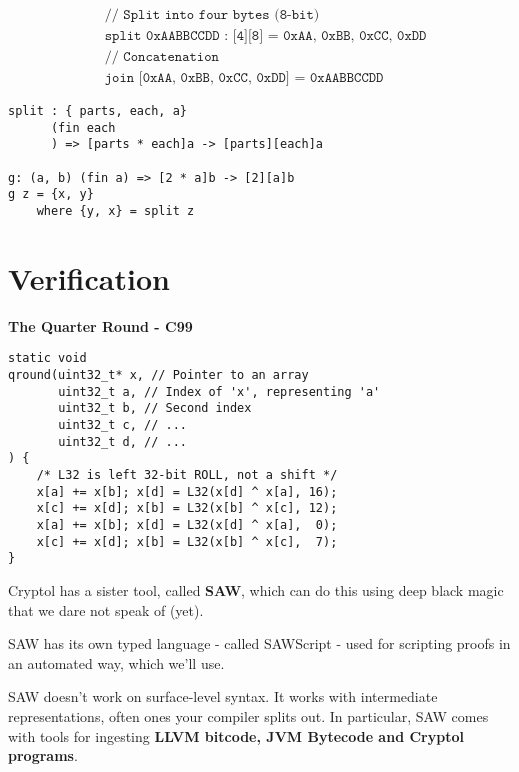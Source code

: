 \begin{align*}
&\texttt{// Split into four bytes (8-bit)}\\
&\texttt{split 0xAABBCCDD : [4][8] = {0xAA, 0xBB, 0xCC, 0xDD}} \\&\texttt{// Concatenation} \\
&\texttt{join [0xAA, 0xBB, 0xCC, 0xDD] = 0xAABBCCDD}
\end{align*}
\begin{lstlisting}[style=haskell]
split : { parts, each, a}
	  (fin each
	  ) => [parts * each]a -> [parts][each]a

g: (a, b) (fin a) => [2 * a]b -> [2][a]b
g z = {x, y}
	where {y, x} = split z
\end{lstlisting}

\newpage
\section{Verification}

\textbf{The Quarter Round - C99}

\begin{lstlisting}[style=C]
static void
qround(uint32_t* x, // Pointer to an array
	   uint32_t a, // Index of 'x', representing 'a'
	   uint32_t b, // Second index
	   uint32_t c, // ...
	   uint32_t d, // ...
) {
	/* L32 is left 32-bit ROLL, not a shift */
	x[a] += x[b]; x[d] = L32(x[d] ^ x[a], 16);
	x[c] += x[d]; x[b] = L32(x[b] ^ x[c], 12);
	x[a] += x[b]; x[d] = L32(x[d] ^ x[a],  0);
	x[c] += x[d]; x[b] = L32(x[b] ^ x[c],  7);
}
\end{lstlisting}

Cryptol has a sister tool, called \textbf{SAW}, which can do this using deep black magic that we dare not speak of (yet).

SAW has its own typed language - called SAWScript - used for scripting proofs in an automated way, which we'll use.

SAW doesn't work on surface-level syntax. It works with intermediate representations, often ones your compiler splits out.
In particular, SAW comes with tools for ingesting \textbf{LLVM bitcode, JVM Bytecode and Cryptol programs}.